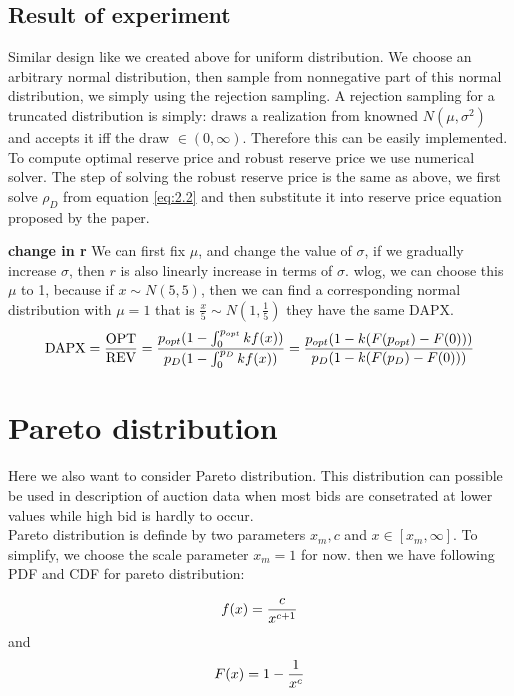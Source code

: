 \subsection{Result of experiment}

Similar design like we created above for uniform distribution. We choose an arbitrary normal distribution, then sample from nonnegative part of this normal distribution, we simply using the rejection sampling. A rejection sampling for a truncated distribution is simply: draws a realization from knowned $N(\mu, \sigma^2)$ and accepts it iff the draw $\in (0,\infty)$. Therefore this can be easily implemented. To compute optimal reserve price and robust reserve price we use numerical solver.
The step of solving the robust reserve price is the same as above, we first solve $\rho_D$ from equation \ref{eq:2.2} and then substitute it into reserve price equation proposed by the paper.  
	
\textbf{change in r}
We can first fix $\mu$, and change the value of $\sigma$, if we gradually increase $\sigma$, then $r$ is also linearly increase in terms of $\sigma$. wlog, we can choose this $\mu$ to 1, because if $x \sim N(5, 5)$, then we can find a corresponding normal distribution with $\mu = 1$ that is $\frac{x}{5} \sim N(1, \frac{1}{5})$ they have the same DAPX.
\begin{equation}\notag
\text{DAPX} = \frac{\text{OPT}}{\text{REV}} =\frac{p_{opt}(1-\int_{0}^{p_{opt}} kf(x))}{p_D(1-\int_{0}^{p_{D}}kf(x))} =\frac{p_{opt}(1-k(F(p_{opt})-F(0)))}{p_D(1-k(F(p_{D})-F(0)))} 	
\end{equation} 

\section{Pareto distribution}
Here we also want to consider Pareto distribution. This distribution can possible be used in description of auction data when most bids are consetrated at lower values while high bid is hardly to occur. \\
Pareto distribution is definde by two parameters $x_m, c$ and $x \in [x_m, \infty]$. To simplify, we choose the scale parameter $x_m = 1$ for now. then we have following PDF and CDF for pareto distribution:

\begin{equation}\notag
f(x) = \frac{c}{x^{c+1}} 
\end{equation} 
and 
\begin{equation}\notag
F(x) = 1- \frac{1}{x^c}
\end{equation} 

